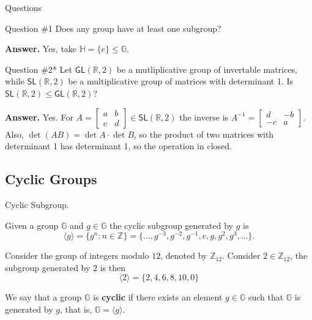 \documentclass{zkdl-presentation-template}
\begin{document}
  \begin{frame}{Questions}
    \begin{questionblock}{Question \#1}
      Does any group have at least one subgroup?\pause
    \end{questionblock}

    \textbf{Answer.} Yes, take $\mathbb{H} = \{e\} \leq \mathbb{G}$.\pause

    \begin{questionblock}{Question \#2*}
      Let $\mathsf{GL}(\mathbb{R},2)$ be a mutliplicative group of invertable matrices, while $\mathsf{SL}(\mathbb{R},2)$ be a multiplicative group of matrices with determinant 1. Is $\mathsf{SL}(\mathbb{R},2) \leq \mathsf{GL}(\mathbb{R},2)$?\pause
    \end{questionblock}

    \textbf{Answer.} Yes. For $A = \begin{bmatrix}
      a & b \\
      c & d
    \end{bmatrix} \in \mathsf{SL}(\mathbb{R},2)$ the inverse is $A^{-1} = \begin{bmatrix}
      d & -b \\ -c & a
    \end{bmatrix}$. Also, $\det (AB) = \det A \cdot \det B$, so the product of two matrices with determinant 1 has determinant 1, so the operation in closed.
  \end{frame}

  \subsection{Cyclic Groups}

  \begin{frame}{Cyclic Subgroup.}
    \begin{definition}
      Given a group $\mathbb{G}$ and $g \in \mathbb{G}$ the cyclic subgroup generated by $g$ is
      \begin{equation*}
          \langle g \rangle = \{g^n: n \in \mathbb{Z}\} = \{\dots,g^{-3}, g^{-2}, g^{-1}, e, g, g^2, g^3, \dots\}.
      \end{equation*}
    \end{definition}
    \pause
    \begin{example}
        Consider the group of integers modulo $12$, denoted by $\mathbb{Z}_{12}$. Consider $2 \in \mathbb{Z}_{12}$, the subgroup generated by $2$ is then
        \begin{equation*}
            \langle 2 \rangle = \{2,4,6,8,10, 0\}
        \end{equation*}
    \end{example}
    \pause
    \begin{definition}
      We say that a group $\mathbb{G}$ is \textbf{cyclic} if there exists an element $g \in \mathbb{G}$ such that $\mathbb{G}$ is generated by $g$, that is, $\mathbb{G} = \langle g \rangle$.
    \end{definition}
  \end{frame}
\end{document}

